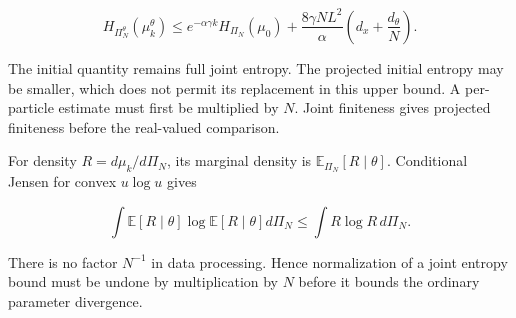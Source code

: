 \documentclass[11pt,a4paper]{report}
\begin{document}
\[H_{\Pi_N^\theta}(\mu_k^\theta)
\le e^{-\alpha\gamma k}H_{\Pi_N}(\mu_0)
+\frac{8\gamma NL^2}{\alpha}\left(d_x+\frac{d_\theta}N\right).\]

The initial quantity remains full joint entropy. The projected initial entropy may be smaller, which does not permit its replacement in this upper bound. A per-particle estimate must first be multiplied by \(N\). Joint finiteness gives projected finiteness before the real-valued comparison.



For density \(R=d\mu_k/d\Pi_N\), its marginal density is \(\mathbb E_{\Pi_N}[R\mid\theta]\). Conditional Jensen for convex \(u\log u\) gives

\[\int\mathbb E[R\mid\theta]\log\mathbb E[R\mid\theta]d\Pi_N
\le\int R\log R\,d\Pi_N.\]

There is no factor \(N^{-1}\) in data processing. Hence normalization of a joint entropy bound must be undone by multiplication by \(N\) before it bounds the ordinary parameter divergence.
\end{document}
